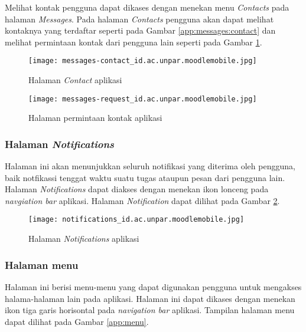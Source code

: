 Melihat kontak pengguna dapat dikases dengan menekan menu \textit{Contacts} pada halaman \textit{Messages}. Pada halaman \textit{Contacts} pengguna akan dapat melihat kontaknya yang terdaftar seperti pada Gambar \ref{app:messages:contact} dan melihat permintaan kontak dari pengguna lain seperti pada Gambar \ref{app:messages:request}.

\begin{figure}[H]
\centering
\begin{minipage}{.3\textwidth} 
	\centering  
	\texttt{[image: messages-contact\_id.ac.unpar.moodlemobile.jpg]}  
	\caption[Halaman \textit{Contact} aplikasi] {Halaman \textit{Contact} aplikasi} 
	\label{app:messages:contact} 
\end{minipage}
\hspace{.2\textwidth}
\begin{minipage}{.3\textwidth}
	\centering  
	\texttt{[image: messages-request\_id.ac.unpar.moodlemobile.jpg]}  
	\caption[Halaman permintaan kontak aplikasi] {Halaman permintaan kontak aplikasi} 
	\label{app:messages:request} 
\end{minipage}
\end{figure}

\subsubsection{Halaman \textit{Notifications}}

Halaman ini akan menunjukkan seluruh notifikasi yang diterima oleh pengguna, baik notfikassi tenggat waktu suatu tugas ataupun pesan dari pengguna lain. Halaman \textit{Notifications} dapat diakses dengan menekan ikon lonceng pada \textit{navgiation bar} aplikasi. Halaman \textit{Notification} dapat dilihat pada Gambar \ref{app:notifications}.


\begin{figure}[H] 
	\centering  
	\texttt{[image: notifications\_id.ac.unpar.moodlemobile.jpg]}  
	\caption[Halaman \textit{Notifications} aplikasi] {Halaman \textit{Notifications} aplikasi} 
	\label{app:notifications} 
\end{figure}  

\subsubsection{Halaman menu}

Halaman ini berisi menu-menu yang dapat digunakan pengguna untuk mengakses halama-halaman lain pada aplikasi. Halaman ini dapat dikases dengan menekan ikon tiga garis horisontal pada \textit{navigation bar} aplikasi. Tampilan halaman menu dapat dilihat pada Gambar \ref{app:menu}.


